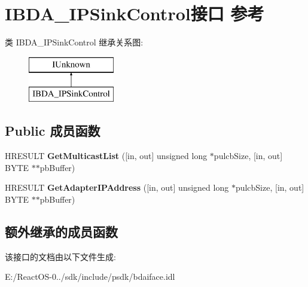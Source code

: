 \hypertarget{interface_i_b_d_a___i_p_sink_control}{}\section{I\+B\+D\+A\+\_\+\+I\+P\+Sink\+Control接口 参考}
\label{interface_i_b_d_a___i_p_sink_control}
类 I\+B\+D\+A\+\_\+\+I\+P\+Sink\+Control 继承关系图\+:\begin{figure}[H]
\begin{center}
\leavevmode
\includegraphics[height=2.000000cm]{interface_i_b_d_a___i_p_sink_control}
\end{center}
\end{figure}
\subsection*{Public 成员函数}
\begin{DoxyCompactItemize}
\item 
\mbox{\label{interface_i_b_d_a___i_p_sink_control_af17902d8897229e33cb9195e0cfcca18}} 
H\+R\+E\+S\+U\+LT {\bfseries Get\+Multicast\+List} (\mbox{[}in, out\mbox{]} unsigned long $\ast$pulcb\+Size, \mbox{[}in, out\mbox{]} B\+Y\+TE $\ast$$\ast$pb\+Buffer)
\item 
\mbox{\label{interface_i_b_d_a___i_p_sink_control_a77684488289aec130cb17726c0ec0d8f}} 
H\+R\+E\+S\+U\+LT {\bfseries Get\+Adapter\+I\+P\+Address} (\mbox{[}in, out\mbox{]} unsigned long $\ast$pulcb\+Size, \mbox{[}in, out\mbox{]} B\+Y\+TE $\ast$$\ast$pb\+Buffer)
\end{DoxyCompactItemize}
\subsection*{额外继承的成员函数}


该接口的文档由以下文件生成\+:\begin{DoxyCompactItemize}
\item 
E\+:/\+React\+O\+S-\/0../sdk/include/psdk/bdaiface.\+idl\end{DoxyCompactItemize}
